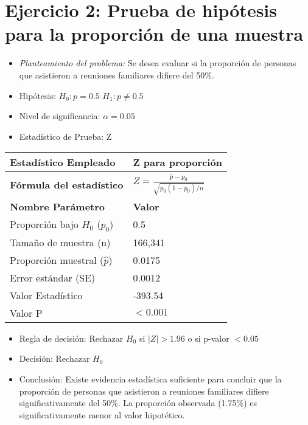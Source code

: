 \documentclass[12pt,a4paper]{article}
\begin{document}
\section*{Ejercicio 2: Prueba de hipótesis para la proporción de una muestra}
\begin{itemize}
    \item \textit{Planteamiento del problema:} Se desea evaluar si la proporción de personas que asistieron a reuniones familiares difiere del 50\%.
    \item Hipótesis: \quad $H_{0}: p = 0.5$ \hspace{2cm} $H_{1}: p \neq 0.5$
    \item Nivel de significancia: $\alpha = 0.05$
    \item Estadístico de Prueba: Z
\end{itemize}

\begin{tabular}{|m{7cm}|m{7cm}|}
\hline
\textbf{Estadístico Empleado} & Z para proporción \\ \hline
\textbf{Fórmula del estadístico} & $Z = \frac{\hat{p} - p_0}{\sqrt{p_0(1-p_0)/n}}$ \\ \hline
\textbf{Nombre Parámetro} & \textbf{Valor} \\ \hline
Proporción bajo $H_0$ ($p_0$) & 0.5 \\ \hline
Tamaño de muestra (n) & 166,341 \\ \hline
Proporción muestral ($\hat{p}$) & 0.0175 \\ \hline
Error estándar (SE) & 0.0012 \\ \hline
Valor Estadístico & -393.54 \\ \hline
Valor P & $< 0.001$ \\ \hline
\end{tabular}

\begin{itemize}
    \item Regla de decisión: Rechazar $H_0$ si $|Z| > 1.96$ o si p-valor $< 0.05$
    \item Decisión: Rechazar $H_0$
    \item Conclusión: Existe evidencia estadística suficiente para concluir que la proporción de personas que asistieron a reuniones familiares difiere significativamente del 50\%. La proporción observada (1.75\%) es significativamente menor al valor hipotético.
\end{itemize}
\end{document}

